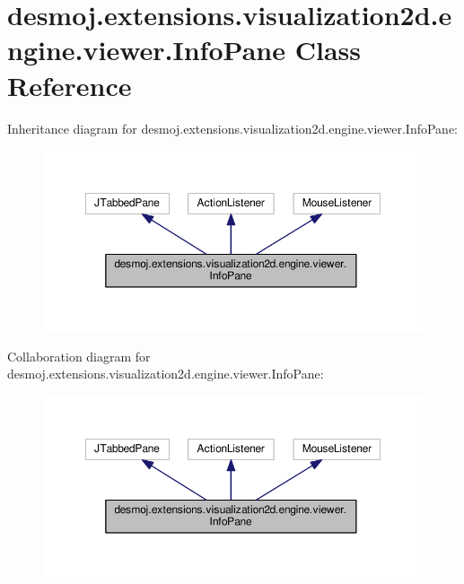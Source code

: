 \section{desmoj.\-extensions.\-visualization2d.\-engine.\-viewer.\-Info\-Pane Class Reference}
\label{classdesmoj_1_1extensions_1_1visualization2d_1_1engine_1_1viewer_1_1_info_pane}


Inheritance diagram for desmoj.\-extensions.\-visualization2d.\-engine.\-viewer.\-Info\-Pane\-:
\nopagebreak
\begin{figure}[H]
\begin{center}
\leavevmode
\includegraphics[width=350pt]{classdesmoj_1_1extensions_1_1visualization2d_1_1engine_1_1viewer_1_1_info_pane__inherit__graph}
\end{center}
\end{figure}


Collaboration diagram for desmoj.\-extensions.\-visualization2d.\-engine.\-viewer.\-Info\-Pane\-:
\nopagebreak
\begin{figure}[H]
\begin{center}
\leavevmode
\includegraphics[width=350pt]{classdesmoj_1_1extensions_1_1visualization2d_1_1engine_1_1viewer_1_1_info_pane__coll__graph}
\end{center}
\end{figure}
